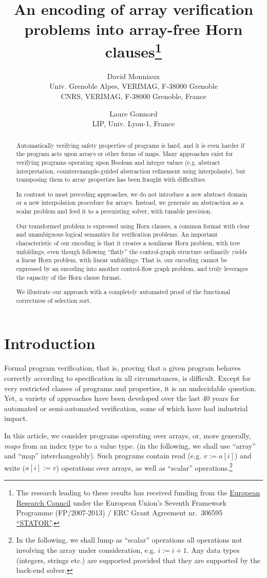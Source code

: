 \documentclass[a4paper]{article}
\title{An encoding of array verification problems into array-free Horn clauses\thanks{The research leading to these results has received funding from the \href{http://erc.europa.eu/}{European Research Council} under the European Union's Seventh Framework Programme (FP/2007-2013) / ERC Grant Agreement nr.~306595 \href{http://stator.imag.fr/}{\mbox{``STATOR''}}.}}
\author{David Monniaux\\
{\small Univ. Grenoble Alpes, VERIMAG, F-38000 Grenoble}\\
{\small CNRS, VERIMAG, F-38000 Grenoble, France}
\and Laure Gonnord\\
{\small LIP, Univ. Lyon-1, France}
}
\theoremstyle{definition}
\theoremstyle{plain}
\begin{document}
\maketitle

\begin{abstract}
Automatically verifying safety properties of programs is hard, and it is even harder if the program acts upon arrays or other forms of maps.
Many approaches exist for verifying programs operating upon Boolean and integer values (e.g. abstract interpretation, counterexample-guided abstraction refinement using interpolants), but transposing them to array properties has been fraught with difficulties.

In contrast to most preceding approaches, we do not introduce a new abstract domain or a new interpolation procedure for arrays. Instead, we generate an abstraction as a scalar problem and feed it to a preexisting solver, with tunable precision.

Our transformed problem is expressed using Horn clauses, a common format with clear and unambiguous logical semantics for verification problems.
An important characteristic of our encoding is that it creates a nonlinear Horn problem, with tree unfoldings, even though following ``flatly'' the control-graph structure ordinarily yields a linear Horn problem, with linear unfoldings.
That is, our encoding cannot be expressed by an encoding into another control-flow graph problem, and truly leverages the capacity of the Horn clause format.

We illustrate our approach with a completely automated proof of the functional correctness of selection sort.
\end{abstract}

\section{Introduction}
Formal program verification, that is, proving that a given program behaves correctly according to specification in all circumstances, is difficult.
Except for very restricted classes of programs and properties, it is an undecidable question.
Yet, a variety of approaches have been developed over the last 40 years for automated or semi-automated verification, some of which have had industrial impact.

In this article, we consider programs operating over arrays, or, more generally, \emph{maps} from an index type to a value type. (in the following, we shall use ``array'' and ``map'' interchangeably).
Such programs contain read (e.g. $v:=a[i]$) and write ($a[i]:=v$) operations over arrays, as well as ``scalar'' operations.\footnote{In the following, we shall lump as ``scalar'' operations all operations not involving the array under consideration, e.g. $i:=i+1$. Any data types (integers, strings etc.) are supported provided that they are supported by the back-end solver.}
\end{document}
